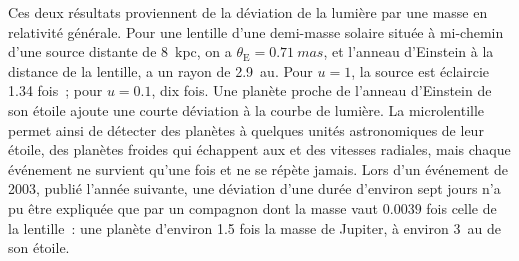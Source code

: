 \admitted

Ces deux résultats proviennent de la déviation de la lumière par une masse en relativité générale.
Pour une lentille d'une demi-masse solaire située à mi-chemin d'une source
distante de \qty{8}{kpc}, on a $\theta_\mathrm E = \qty{0.71}{mas}$, et l'anneau d'Einstein
à la distance de la lentille, a un rayon de \qty{2.9}{au}.
Pour $u = 1$, la source est éclaircie 1.34 fois~; pour $u = 0.1$, dix fois. Une
planète proche de l'anneau d'Einstein de son étoile ajoute une courte déviation à la
courbe de lumière. La microlentille permet ainsi de détecter des planètes à quelques
unités astronomiques de leur étoile, des planètes froides qui échappent aux  et des vitesses radiales, mais chaque événement ne survient qu'une fois et ne se répète jamais. Lors d'un événement de 2003,
publié l'année suivante, une déviation d'une durée d'environ sept jours n'a pu être expliquée que
par un compagnon dont la masse vaut $\num{0.0039}$ fois celle de la lentille~: une planète
d'environ 1.5 fois la masse de Jupiter, à environ \qty{3}{au} de son
étoile.

